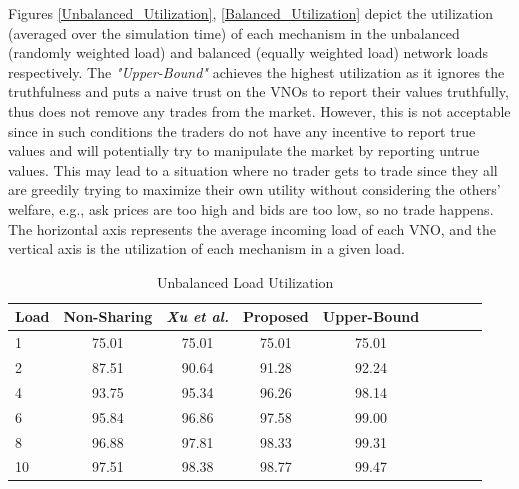 Figures \ref{Unbalanced_Utilization}, \ref{Balanced_Utilization} depict the utilization (averaged over the simulation time) of each mechanism in the unbalanced (randomly weighted load) and balanced (equally weighted load) network loads respectively. The \textit{"Upper-Bound"} achieves the highest utilization as it ignores the truthfulness and puts a naive trust on the \acp{VNO} to report their values truthfully, thus does not remove any trades from the market. However, this is not acceptable since in such conditions the traders do not have any incentive to report true values and will potentially try to manipulate the market by reporting untrue values. This may lead to a situation where no trader gets to trade since they all are greedily trying to maximize their own utility without considering the others' welfare, e.g., ask prices are too high and bids are too low, so no trade happens. The horizontal axis represents the average incoming load of each VNO, and the vertical axis is the utilization of each mechanism in a given load.

\begin{table}[htbp]
   \caption{Unbalanced Load Utilization}
   \label{tab:util:unbal}
   \small %
   \centering %
   \begin{tabular}{lcccccccr} %
   \toprule[\heavyrulewidth]\toprule[\heavyrulewidth]
       Load & Non-Sharing    & \textit{Xu et al.} & Proposed    & Upper-Bound \\ \hline
   \midrule
    1  & 75.01  & 75.01 & 75.01 & 75.01\\
    2  & 87.51  & 90.64 & 91.28 & 92.24\\
    4  & 93.75  & 95.34 & 96.26 & 98.14\\
    6  & 95.84  & 96.86 & 97.58 & 99.00\\
    8  & 96.88  & 97.81 & 98.33 & 99.31\\
    10 & 97.51  & 98.38 & 98.77 & 99.47\\
   \bottomrule[\heavyrulewidth]
   \end{tabular}
\end{table}

